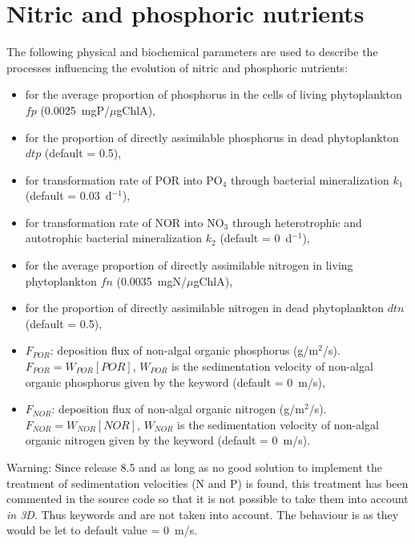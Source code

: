 \section{Nitric and phosphoric nutrients}

The following physical and biochemical parameters are used
to describe the processes influencing the evolution of nitric and phosphoric nutrients:

\begin{itemize}
\item {}
  for the average proportion of phosphorus in the cells of living phytoplankton $fp$ (0.0025~mgP/$\mu$gChlA),
\item {}
  for the proportion of directly assimilable phosphorus in dead phytoplankton $dtp$ (default = 0.5),
\item {}
  for transformation rate of POR into PO$_4$ through bacterial mineralization $k_1$ (default = 0.03~d$^{-1}$),
\item {}
  for transformation rate of NOR into NO$_3$ through heterotrophic
  and autotrophic bacterial mineralization $k_2$ (default = 0~d$^{-1}$),
\item {}
  for the average proportion of directly assimilable nitrogen in living phytoplankton $fn$ (0.0035~mgN/$\mu$gChlA),
\item {}
  for the proportion of directly assimilable nitrogen in dead phytoplankton $dtn$ (default = 0.5),
\item $F_{POR}$: deposition flux of non-algal organic phosphorus (g/m$^2$/s).
  $F_{POR} = W_{POR} [POR]$,
  $W_{POR}$ is the sedimentation velocity of non-algal organic phosphorus
  given by the keyword 
  (default = 0~m/s),
\item $F_{NOR}$: deposition flux of non-algal organic nitrogen (g/m$^2$/s).
  $F_{NOR} = W_{NOR} [NOR]$, $W_{NOR}$ is the sedimentation velocity of non-algal organic nitrogen
  given by the keyword 
  (default = 0~m/s).
\end{itemize}

\begin{WarningBlock}{Warning:}
Since release 8.5 and as long as no good solution to implement the treatment of
sedimentation velocities (N and P) is found, this treatment has
been commented in the source code so that it is not possible to take them into
account \emph{in 3D}.
Thus keywords  and
 are not taken into account.
The behaviour is as they would be let to default value = 0~m/s.
\end{WarningBlock}
